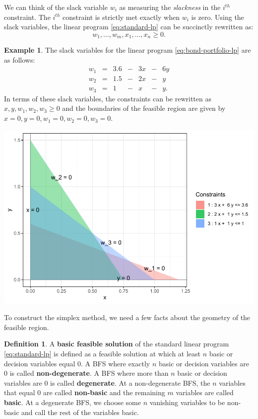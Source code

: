 \documentclass[
]{book}
\theoremstyle{definition}
\newtheorem{definition}{Definition}[chapter]
\theoremstyle{definition}
\newtheorem{example}{Example}[chapter]
\theoremstyle{definition}
\theoremstyle{definition}
\theoremstyle{remark}
\begin{document}
We can think of the slack variable \(w_i\) as measuring the \emph{slackness} in the \(i^{th}\) constraint. The \(i^{th}\) constraint is strictly met exactly when \(w_i\) is zero. Using the slack variables, the linear program \eqref{eq:standard-lp} can be succinctly rewritten as:
\begin{equation*}
  w_1, \dots, w_m, x_1, \dots, x_n \geq 0.
\end{equation*}

\begin{example}
The slack variables for the linear program \eqref{eq:bond-portfolio-lp} are as follows:
\begin{equation*}
  \begin{array}{rlllllll}
  w_1 & = & 3.6 & - & 3x & - & 6y \\
  w_2 & = & 1.5 & - & 2x & - & y \\
  w_3 & = & 1 & - & x & - & y.
  \end{array}
\end{equation*}
In terms of these slack variables, the constraints can be rewritten as \(x, y, w_1, w_2, w_3 \ge 0\) and the boundaries of the feasible region are given by \(x = 0, y = 0, w_1 = 0, w_2 = 0, w_3 = 0\).

\includegraphics{Introduction-to-Optimization_files/figure-latex/fig-bond-portfolio-slack-1.pdf}
\end{example}

To construct the simplex method, we need a few facts about the geometry of the feasible region.

\begin{definition}
\protect\hypertarget{def:degeneracy}{}\label{def:degeneracy}A \textbf{basic feasible solution} of the standard linear program \eqref{eq:standard-lp} is defined as a feasible solution at which at least \(n\) basic or decision variables equal 0. A BFS where exactly \(n\) basic or decision variables are 0 is called \textbf{non-degenerate}. A BFS where more than \(n\) basic or decision variables are 0 is called \textbf{degenerate}. At a non-degenerate BFS, the \(n\) variables that equal 0 are called \textbf{non-basic} and the remaining \(m\) variables are called \textbf{basic}.
At a degenerate BFS, we choose some \(n\) vanishing variables to be non-basic and call the rest of the variables basic.
\end{definition}
\end{document}

